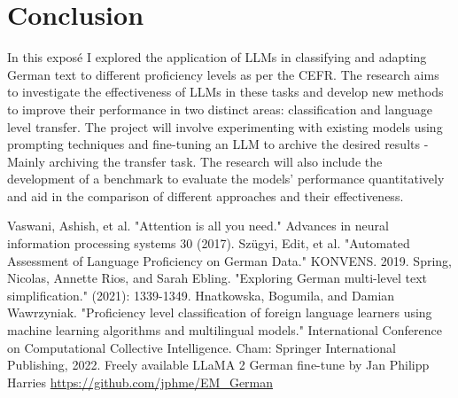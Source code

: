 \documentclass{article}
\begin{document}
\section{Conclusion}
In this exposé I explored the application of LLMs in classifying and adapting German text to
different proficiency levels as per the CEFR. The research aims to investigate the effectiveness
of LLMs in these tasks and develop new methods to improve their performance in two distinct areas:
classification and language level transfer. The project will involve experimenting with existing
models using prompting techniques and fine-tuning an LLM to archive the desired results - Mainly
archiving the transfer task. The research will also include the development of a benchmark to
evaluate the models' performance quantitatively and aid in the comparison of different approaches
and their effectiveness.

\newpage


\begin{thebibliography}{unsrt}
    Vaswani, Ashish, et al. "Attention is all you need." Advances in neural information processing systems 30 (2017).
    Szügyi, Edit, et al. "Automated Assessment of Language Proficiency on German Data." KONVENS. 2019.
    Spring, Nicolas, Annette Rios, and Sarah Ebling. "Exploring German multi-level text simplification." (2021): 1339-1349.
    Hnatkowska, Bogumila, and Damian Wawrzyniak. "Proficiency level classification of foreign language learners using machine learning algorithms and multilingual models." International Conference on Computational Collective Intelligence. Cham: Springer International Publishing, 2022.
    Freely available LLaMA 2 German fine-tune by Jan Philipp Harries \url{https://github.com/jphme/EM_German}
\end{thebibliography}
\end{document}
